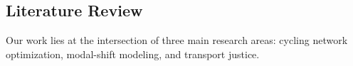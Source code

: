 \documentclass[lettersize,journal]{IEEEtran}
\begin{document}


\subsection{Literature Review}

Our work lies at the intersection of three main research areas: cycling network optimization, modal-shift modeling, and transport justice.
\end{document}
